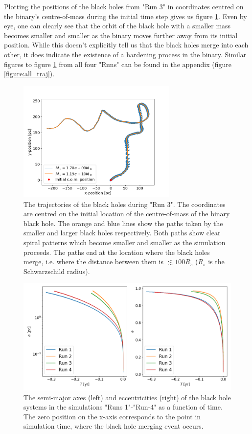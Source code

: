 \documentclass[english, oneside]{HYgradu}
\begin{document}
Plotting the positions of the black holes from "Run 3" in coordinates centred on the binary's centre-of-mass during the initial time step gives us figure \ref{figure:run3_traj}. Even by eye, one can clearly see that the orbit of the black hole with a smaller mass becomes smaller and smaller as the binary moves further away from its initial position. While this doesn't explicitly tell us that the black holes merge into each other, it does indicate the existence of a hardening process in the binary. Similar figures to figure \ref{figure:run3_traj} from all four "Runs" can be found in the appendix (figure \ref{figure:all_traj}).

\begin{figure}[h]
	\centering	
	\includegraphics[width=0.7\textwidth]{Run3_Trajectory.png}	
	\caption{The trajectories of the black holes during "Run 3". The coordinates are centred on the initial location of the centre-of-mass of the binary black hole. The orange and blue lines show the paths taken by the smaller and larger black holes respectively. Both paths show clear spiral patterns which become smaller and smaller as the simulation proceeds. The paths end at the location where the black holes merge, i.e. where the distance between them is $\lesssim 100 R_s$ ($R_s$ is the Schwarzschild radius).}
	\label{figure:run3_traj}
\end{figure}

\begin{figure}[h]
	\centering
	\includegraphics[width=\textwidth]{semi_major_and_ecc.png}
	\caption{The semi-major axes (left) and eccentricities (right) of the black hole systems in the simulations "Runs 1"-"Run-4" as a function of time. The zero position on the x-axis corresponds to the point in simulation time, where the black hole merging event occurs.}
	\label{figure:semi_and_ecc}
\end{figure}
\end{document}
